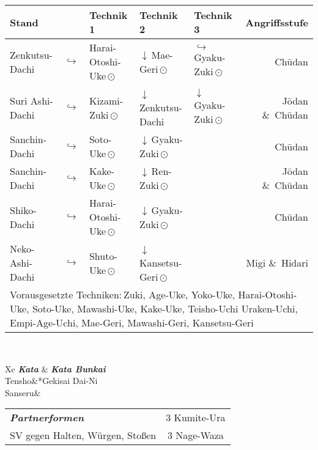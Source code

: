 	\null\vfill\null
	\begin{tabularx}{\textwidth}{llllXr}
		\textbf{Stand} 	&  	& \textbf{Technik 1} & \textbf{Technik 2} 				& \textbf{Technik 3}& \textbf{Angriffsstufe}\\
		\midrule
		Zenkutsu-Dachi 	& \(\hookrightarrow\)	& Harai-Otoshi-Uke\,\(\odot\) 	& \(\downarrow\)\,Mae-Geri\,\(\odot\)	& \(\hookrightarrow\) 	 Gyaku-Zuki\,\(\odot\)	& Ch\={u}dan \\
		Suri Ashi-Dachi	& \(\hookrightarrow\)	& Kizami-Zuki\,\(\odot\)		& \(\downarrow\)\,Zenkutsu-Dachi & \(\downarrow\)	 Gyaku-Zuki\,\(\odot\)	& J\={o}dan \&~Ch\={u}dan \\
		Sanchin-Dachi 	& \(\hookrightarrow\)	& Soto-Uke\,\(\odot\) 			& \(\downarrow\)\,Gyaku-Zuki\,\(\odot\) 				&						&	 					 Ch\={u}dan \\
		Sanchin-Dachi 	& \(\hookrightarrow\)	& Kake-Uke\,\(\odot\) 			& \(\downarrow\)\,Ren-Zuki\,\(\odot\) 					&						& 						 J\={o}dan \&~Ch\={u}dan \\
		Shiko-Dachi 	& \(\hookrightarrow\)	& Harai-Otoshi-Uke\,\(\odot\) 	& \(\downarrow\)\,Gyaku-Zuki\,\(\odot\) 				&						& 						 Ch\={u}dan \\
		Neko-Ashi-Dachi	& \(\hookrightarrow\)	& Shuto-Uke\,\(\odot\) 			& \(\downarrow\)\,Kansetsu-Geri\,\(\odot\) 					&						& 						 Migi \&~Hidari  \\
		\midrule
		\multicolumn{6}{p{\linewidth-2\tabcolsep}}{{\footnotesize Vorausgesetzte Techniken:\,Zuki, Age-Uke, Yoko-Uke, Harai-Otoshi-Uke, Soto-Uke, Mawashi-Uke, Kake-Uke, Teisho-Uchi Uraken-Uchi, Empi-Age-Uchi, Mae-Geri, Mawashi-Geri, Kansetsu-Geri}}\\
		\midrule
	\end{tabularx}\\
	\null\vfill\null
	\begin{minipage}[t]{0.45\textwidth}
		\begin{tabularx}{\textwidth}{Xc}
			\midrule
			\textbf{\textit{Kata}} & \textbf{\textit{Kata Bunkai}} \\
			Tensho&*{Gekisai Dai-Ni}\\
			Sanseru& \\
			\midrule
		\end{tabularx}
	\end{minipage}
	\null\hfill\null
	\begin{minipage}[t]{0.45\textwidth}
		\begin{tabularx}{\textwidth}{Xc}
			\midrule
			{\textbf{\textit{Partnerformen}}} & 3 Kumite-Ura\\
			SV gegen Halten, Würgen, Stoßen & 3 Nage-Waza  \\
			\midrule
		\end{tabularx}
	\end{minipage}\\
